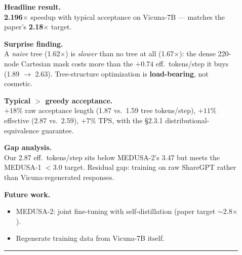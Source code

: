 \documentclass[final,t]{beamer}
\newlength{\colw}
\newlength{\colsep}
\newcommand{\separatorcolumn}{\begin{column}{\colsep}\end{column}}
\begin{document}
\begin{frame}[fragile]
\begin{columns}[t]
\begin{column}{\colw}
\end{column}

\separatorcolumn

\begin{column}{\colw}
\setlength{\parskip}{1ex}\justifying

\begin{tcolorbox}[posterbox, title=5. Key Insight \& Takeaways]
\setlength{\parskip}{1.8ex}
\justifying
\textbf{Headline result.}\\[0.6ex]
\textbf{2.196$\times$} speedup with typical acceptance on Vicuna-7B --- matches the paper's \textbf{2.18$\times$} target.

\textbf{Surprise finding.}\\[0.6ex]
A \emph{naive} tree (1.62$\times$) is \emph{slower} than no tree at all (1.67$\times$): the dense 220-node Cartesian mask costs more than the $+0.74$ eff.\ tokens/step it buys (1.89 $\to$ 2.63). Tree-structure optimization is \textbf{load-bearing}, not cosmetic.

\textbf{Typical $>$ greedy acceptance.}\\[0.6ex]
$+18\%$ raw acceptance length (1.87 vs.\ 1.59 tree tokens/step), $+11\%$ effective (2.87 vs.\ 2.59), $+7\%$ TPS, with the \S2.3.1 distributional-equivalence guarantee.

\textbf{Gap analysis.}\\[0.6ex]
Our 2.87 eff.\ tokens/step sits below MEDUSA-2's 3.47 but meets the MEDUSA-1 $<$3.0 target. Residual gap: training on raw ShareGPT rather than Vicuna-regenerated responses.

\textbf{Future work.}
\begin{itemize}[leftmargin=*, topsep=0.3ex, itemsep=0.3ex]
  \item MEDUSA-2: joint fine-tuning with self-distillation (paper target $\sim$2.8$\times$).
  \item Regenerate training data from Vicuna-7B itself.
\end{itemize}

\vspace{0.8ex}
\hrule
{}


\end{tcolorbox}
\end{column}
\end{columns}
\end{frame}
\end{document}
